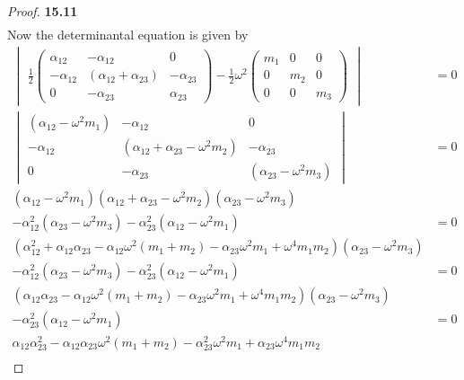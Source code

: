\documentclass[11pt]{article}
\theoremstyle{definition}
\begin{document}
\begin{proof}{\textbf{15.11}}
\begin{align*}
    \end{align*}
    Now the determinantal equation is given by
    \begin{align*}
        \begin{vmatrix}
            \frac{1}{2}\begin{pmatrix}
                \alpha_{12} & -\alpha_{12} & 0\\
                -\alpha_{12} & (\alpha_{12} + \alpha_{23}) & -\alpha_{23}\\
                0 & -\alpha_{23} & \alpha_{23}
            \end{pmatrix}
            - \frac{1}{2}\omega^2\begin{pmatrix}
                m_1 & 0 & 0 \\
                0 & m_2 & 0 \\
                0 & 0 & m_3
            \end{pmatrix}
        \end{vmatrix} &= 0\\
        \begin{vmatrix}
                (\alpha_{12} - \omega^2m_1)  & -\alpha_{12} & 0 \\
                -\alpha_{12} & (\alpha_{12} + \alpha_{23} - \omega^2m_2) & -\alpha_{23} \\
                0 & -\alpha_{23} & (\alpha_{23} -\omega^2 m_3)
        \end{vmatrix} &= 0\\
        (\alpha_{12} - \omega^2m_1)(\alpha_{12} + \alpha_{23} - \omega^2m_2)(\alpha_{23} -\omega^2 m_3)\\
        - \alpha_{12}^2(\alpha_{23} -\omega^2 m_3)
        - \alpha_{23}^2(\alpha_{12} - \omega^2m_1) 
        &= 0\\
        (\alpha_{12}^2 + \alpha_{12}\alpha_{23} - \alpha_{12}\omega^2(m_1 + m_2)
        - \alpha_{23}\omega^2m_1 + \omega^4m_1m_2)
        (\alpha_{23} -\omega^2 m_3)\\
        - \alpha_{12}^2(\alpha_{23} -\omega^2 m_3)
        - \alpha_{23}^2(\alpha_{12} - \omega^2m_1) &= 0\\
        (\alpha_{12}\alpha_{23} - \alpha_{12}\omega^2(m_1 + m_2)
        - \alpha_{23}\omega^2m_1 + \omega^4m_1m_2)
        (\alpha_{23} -\omega^2 m_3)\\
        - \alpha_{23}^2(\alpha_{12} - \omega^2m_1) &= 0\\
        \alpha_{12}\alpha_{23}^2 - \alpha_{12}\alpha_{23}\omega^2(m_1 + m_2)
        - \alpha_{23}^2\omega^2m_1 + \alpha_{23}\omega^4m_1m_2\\

\end{align*}
\end{proof}
\end{document}
